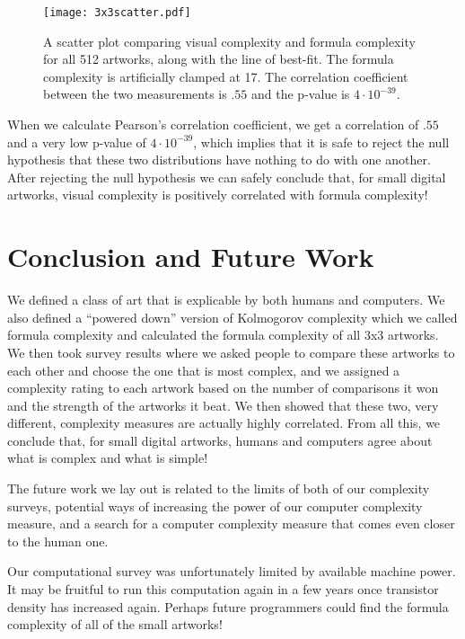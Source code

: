 \documentclass[11pt]{article}
\begin{document}
\begin{figure}
\begin{center}
\texttt{[image: 3x3scatter.pdf]}
\end{center}
\caption{A scatter plot comparing visual complexity and formula complexity for
all 512 artworks, along with the line of best-fit.  The formula complexity is
artificially clamped at 17.  The correlation coefficient between the two
measurements is $.55$ and the p-value is $4\cdot10^{-39}$.} 
\label{fig:scatter}
\end{figure}

When we calculate Pearson's correlation coefficient, we get a correlation of
$.55$ and a very low p-value of $4\cdot10^{-39}$, which implies that it is safe
to reject the null hypothesis that these two distributions have nothing to do
with one another.  After rejecting the null hypothesis we can safely conclude
that, for small digital artworks, visual complexity is positively correlated
with formula complexity!  

\section*{Conclusion and Future Work}

We defined a class of art that is explicable by both humans and computers.  We
also defined a ``powered down'' version of Kolmogorov complexity which we
called formula complexity and calculated the formula complexity of all 3x3
artworks.  We then took survey results where we asked people to compare these
artworks to each other and choose the one that is most complex, and we assigned
a complexity rating to each artwork based on the number of comparisons it won
and the strength of the artworks it beat.  We then showed that these two, very
different, complexity measures are actually highly correlated.  From all this,
we conclude that, for small digital artworks, humans and computers agree
about what is complex and what is simple!

The future work we lay out is related to the limits of both of our complexity
surveys, potential ways of increasing the power of our computer complexity
measure, and a search for a computer complexity measure that comes even closer
to the human one.

Our computational survey was unfortunately limited by available machine power.
It may be fruitful to run this computation again in a few years once transistor
density has increased again.  Perhaps future programmers could find the formula
complexity of all of the small artworks!
\end{document}
